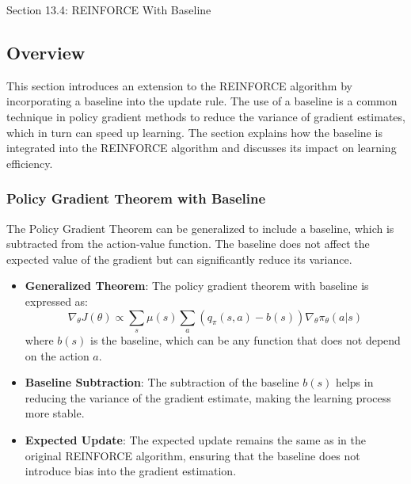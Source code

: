 \begin{notes}{Section 13.4: REINFORCE With Baseline}
    \subsection*{Overview}

    This section introduces an extension to the REINFORCE algorithm by incorporating a baseline into the update rule. The use of a baseline is a common technique in policy gradient methods to reduce the 
    variance of gradient estimates, which in turn can speed up learning. The section explains how the baseline is integrated into the REINFORCE algorithm and discusses its impact on learning efficiency.
    
    \subsubsection*{Policy Gradient Theorem with Baseline}
    
    The Policy Gradient Theorem can be generalized to include a baseline, which is subtracted from the action-value function. The baseline does not affect the expected value of the gradient but can 
    significantly reduce its variance.
    
    \begin{highlight}
    
        \begin{itemize}
            \item \textbf{Generalized Theorem}: The policy gradient theorem with baseline is expressed as:
            \[
            \nabla_\theta J(\theta) \propto \sum_s \mu(s) \sum_a \left( q_\pi(s, a) - b(s) \right) \nabla_\theta \pi_\theta(a|s)
            \]
            where $b(s)$ is the baseline, which can be any function that does not depend on the action $a$.
            \item \textbf{Baseline Subtraction}: The subtraction of the baseline $b(s)$ helps in reducing the variance of the gradient estimate, making the learning process more stable.
            \item \textbf{Expected Update}: The expected update remains the same as in the original REINFORCE algorithm, ensuring that the baseline does not introduce bias into the gradient estimation.
        \end{itemize}
    
    \end{highlight}
    

\end{notes}

